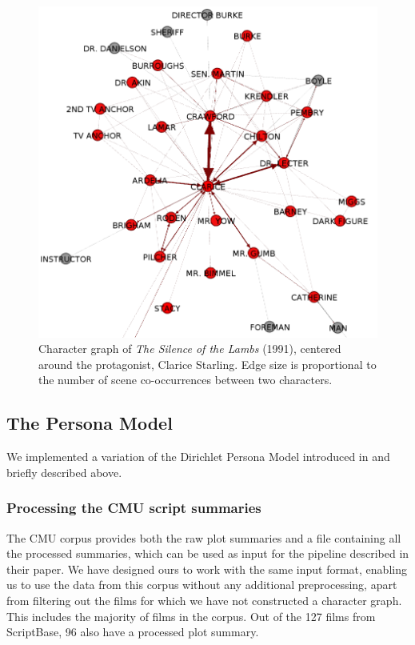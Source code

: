 \documentclass[bsc,frontabs,singlespacing,parskip]{infthesis} %
\begin{document}
\begin{figure}
	\centering
	\includegraphics[scale=0.4]{clarice_graph}
	\caption{Character graph of \textit{The Silence of the Lambs} (1991), centered around the protagonist, Clarice Starling. Edge size is proportional to the number of scene co-occurrences between two characters.}
\end{figure}

\subsection{The Persona Model}
We implemented a variation of the Dirichlet Persona Model introduced in \cite{Bamman2013} and briefly described above.
\subsubsection{Processing the CMU script summaries}
The CMU corpus provides both the raw plot summaries and a file containing all the processed summaries, which can be used as input for the pipeline described in their paper. We have designed ours to work with the same input format, enabling us to use the data from this corpus without any additional preprocessing, apart from filtering out the films for which we have not constructed a character graph. This includes the majority of films in the corpus. Out of the 127 films from ScriptBase, 96 also have a processed plot summary.
\end{document}
